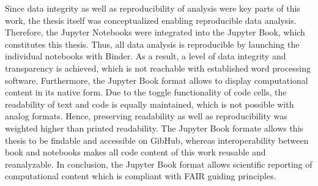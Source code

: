 \documentclass[letterpaper,12pt,english]{jupyterBook}
\begin{document}
\sphinxAtStartPar
Since data integrity as well as reproducibility of analysis were key parts of this work, the thesis itself was conceptualized enabling reproducible data analysis. Therefore, the Jupyter Notebooks were integrated into the Jupyter Book, which constitutes this thesis. Thus, all data analysis is reproducible by launching the individual notebooks with Binder. As a result, a level of data integrity and transparency is achieved, which is not reachable with established word processing software. Furthermore, the Jupyter Book format allows to display computational content in its native form. Due to the toggle functionality of code cells, the readability of text and code is equally maintained, which is not possible with analog formats. Hence, preserving readability as well as reproducibility was weighted higher than printed readability.
The Jupyter Book formate allows this thesis to be findable and accessible on GibHub, whereas interoperability between book and notebooks makes all code content of this work reusable and reanalyzable. In conclusion, the Jupyter Book format allows scientific reporting of computational content which is compliant with FAIR guiding principles.

\sphinxstepscope
\end{document}
